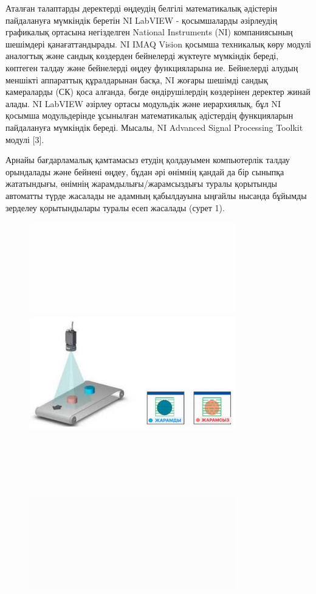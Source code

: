 Аталған талаптарды деректерді өңдеудің белгілі математикалық әдістерін
пайдалануға мүмкіндік беретін NI LabVIEW - қосымшаларды әзірлеудің
графикалық ортасына негізделген National Instruments (NI) компаниясының
шешімдері қанағаттандырады. NI IMAQ Vision қосымша техникалық көру
модулі аналогтық және сандық көздерден бейнелерді жүктеуге мүмкіндік
береді, көптеген талдау және бейнелерді өңдеу функцияларына ие.
Бейнелерді алудың меншікті аппараттық құралдарынан басқа, NI жоғары
шешімді сандық камераларды (СК) қоса алғанда, бөгде өндірушілердің
көздерінен деректер жинай алады. NI LabVIEW әзірлеу ортасы модульдік
және иерархиялық, бұл NI қосымша модульдерінде ұсынылған математикалық
әдістердің функцияларын пайдалануға мүмкіндік береді. Мысалы, NI
Advanced Signal Processing Toolkit модулі {[}3{]}.

Арнайы бағдарламалық қамтамасыз етудің қолдауымен компьютерлік талдау
орындалады және бейнені өңдеу, бұдан әрі өнімнің қандай да бір сыныпқа
жататындығы, өнімнің жарамдылығы/жарамсыздығы туралы қорытынды автоматты
түрде жасалады не адамның қабылдауына ыңғайлы нысанда бұйымды зерделеу
қорытындылары туралы есеп жасалады (сурет 1).


\begin{figure}[H]
	\centering
	\includegraphics[width=0.8\textwidth]{media/ict2/image168}
	\caption*{}
\end{figure}



